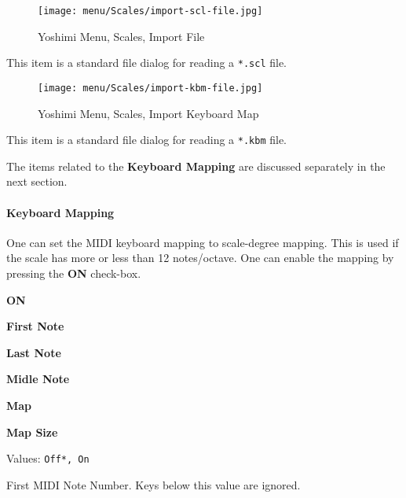 \begin{figure}[H]
   \centering 
   \texttt{[image: menu/Scales/import-scl-file.jpg]}
   \caption{Yoshimi Menu, Scales, Import File}
   \label{fig:yoshimi_menu_scales_import_file}
\end{figure}

   This item is a standard file dialog for reading
   a \texttt{*.scl} file.

\begin{figure}[H]
   \centering 
   \texttt{[image: menu/Scales/import-kbm-file.jpg]}
   \caption{Yoshimi Menu, Scales, Import Keyboard Map}
   \label{fig:yoshimi_menu_scales_import_keyboard_map}
\end{figure}

   This item is a standard file dialog for reading
   a \texttt{*.kbm} file.


   The items related to the \textbf{Keyboard Mapping} are discussed
   separately in the next section.

\paragraph{Keyboard Mapping}
\label{paragraph:menu_scales_keyboard_mapping}

   One can set the MIDI keyboard mapping to scale-degree mapping.
   This is used if the scale has more or less than 12 notes/octave.
   One can enable the mapping by pressing the \textbf{ON} check-box.

   \begin{enumber}
      \item \textbf{ON}
      \item \textbf{First Note}
      \item \textbf{Last Note}
      \item \textbf{Midle Note}
      \item \textbf{Map}
      \item \textbf{Map Size}
   \end{enumber}

   \setcounter{ItemCounter}{0}      %


   Values: \texttt{Off*, On}

   First MIDI Note Number.
   Keys below this value are ignored.

